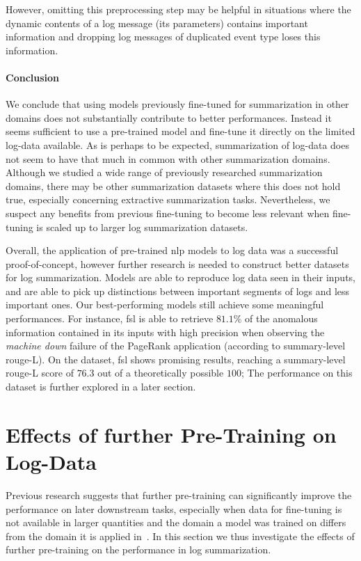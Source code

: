 However, omitting this preprocessing step may be helpful in situations where the dynamic contents of a log message (its parameters)
contains important information and dropping log messages of duplicated event type loses this information.

\paragraph{Conclusion}

We conclude that using models previously fine-tuned for summarization in other domains
does not substantially contribute to better performances.
Instead it seems sufficient to use a pre-trained model and fine-tune it directly on the limited log-data available.
As is perhaps to be expected, summarization of log-data does not seem to have that much in common with other summarization domains.
Although we studied a wide range of previously researched summarization domains,
there may be other summarization datasets where this does not hold true,
especially concerning extractive summarization tasks.
Nevertheless, we suspect any benefits from previous fine-tuning to become less relevant
when fine-tuning is scaled up to larger log summarization datasets.

Overall, the application of pre-trained \ac{nlp} models to log data was a successful proof-of-concept,
however further research is needed to construct better datasets for log summarization.
Models are able to reproduce log data seen in their inputs,
and are able to pick up distinctions between important segments of logs and less important ones.
Our best-performing models still achieve some meaningful performances.
For instance,  \acs{fsl} is able to retrieve \(81.1\%\) of the anomalous information
contained in its inputs with high precision when observing the \emph{machine down} failure of the PageRank application (according to summary-level \acs*{rouge}-L).
On the \logsummary{} dataset,  \acs{fsl} shows promising results,
reaching a summary-level \acs*{rouge}-L score of \(76.3\) out of a theoretically possible \(100\);
The performance on this dataset is further explored in a later section.

\section{Effects of further Pre-Training on Log-Data}\label{sec:evaluation_experiment_pretraining}

Previous research suggests that further pre-training can significantly improve the performance on later downstream tasks,
especially when data for fine-tuning is not available in larger quantities and the domain a model was trained on differs from the domain it is applied in~\parencites[56-57]{pretraining_study}[8345]{dont_stop_pretraining}.
In this section we thus investigate the effects of further pre-training on the performance in log summarization.

